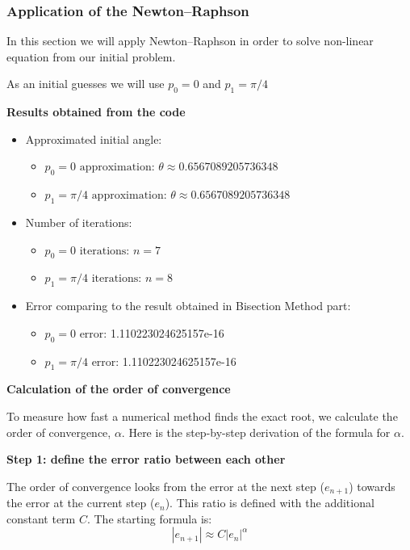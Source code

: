 \documentclass{article}
\begin{document}
\subsubsection{Application of the Newton–Raphson}

In this section we will apply Newton–Raphson in order to solve non-linear equation from our initial problem.

As an initial guesses we will use $p_0 = 0$ and $p_1 = \pi/4$

\vspace{5pt}
\noindent \textbf{Results obtained from the code}
\begin{itemize}
    \item Approximated initial angle:
    \begin{itemize}
        \item $p_0 = 0 \text{ approximation}$: $\theta \approx 0.6567089205736348$
        \item $p_1 = \pi/4 \text{ approximation}$: $\theta \approx 0.6567089205736348$
    \end{itemize}
    \item Number of iterations:
    \begin{itemize}
        \item $p_0 = 0 \text{ iterations}$: $n = 7$
        \item $p_1 = \pi/4 \text{ iterations}$: $n = 8$
    \end{itemize}
    \item Error comparing to the result obtained in Bisection Method part: 
    \begin{itemize}
        \item $p_0 = 0 \text{ error}$: 1.110223024625157e-16
        \item $p_1 = \pi/4 \text{ error}$: 1.110223024625157e-16
    \end{itemize}
\end{itemize}

\vspace{5pt}
\noindent \textbf{Calculation of the order of convergence}

To measure how fast a numerical method finds the exact root, we calculate the order of convergence, $\alpha$. Here is the step-by-step derivation of the formula for $\alpha$.

\vspace{5pt}
\noindent \textbf{Step 1: define the error ratio between each other} \cite[page 35-37, 52-54]{Sauer2014}

The order of convergence looks from the error at the next step ($e_{n+1}$) towards the error at the current step ($e_n$). This ratio is defined with the additional constant term $C$. The starting formula is:
\begin{equation*}
    |e_{n+1}| \approx C |e_n|^\alpha
\end{equation*}
\end{document}
